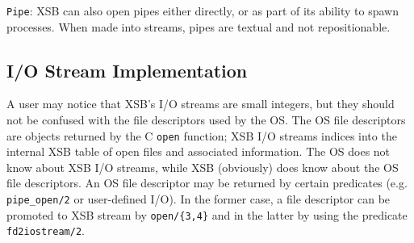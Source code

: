 \item {\tt Pipe}: XSB can also open pipes either directly, or as part
of its ability to spawn processes.  When made into streams, pipes are
textual and not repositionable.
\ei

\subsection{I/O Stream Implementation} \label{sec:IO-streams}

A user may notice that XSB's I/O streams are small integers, but they
should not be confused with the file descriptors used by the OS.  The
OS file descriptors are objects returned by the C {\tt open} function;
XSB I/O streams indices into the internal XSB table of open files and
associated information. The OS does not know about XSB I/O streams,
while XSB (obviously) does know about the OS file descriptors. An OS
file descriptor may be returned by certain predicates (e.g.  {\tt
  pipe\_open/2} or user-defined I/O).  In the former case, a file
descriptor can be promoted to XSB stream by {\tt open/\{3,4\}} and in
the latter by using the predicate {\tt fd2iostream/2}.

